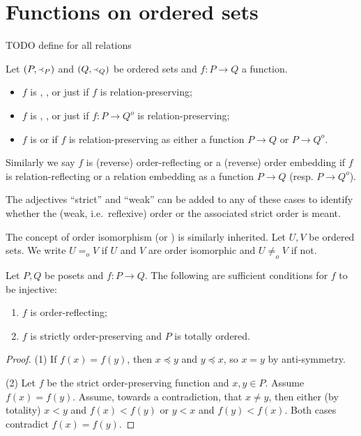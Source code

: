 \section{Functions on ordered sets}
TODO define for all relations
\begin{definition}
Let $(P, \Yleft_P)$ and $(Q, \Yleft_Q)$ be ordered sets and $f: P\to Q$ a function.
\begin{itemize}
\item $f$ is , ,  or just  if $f$ is relation-preserving;
\item $f$ is , ,  or just  if $f: P\to Q^o$ is relation-preserving;
\item $f$ is  or  if $f$ is relation-preserving as either a function $P\to Q$ or $P\to Q^o$.
\end{itemize}
Similarly we say $f$ is (reverse) order-reflecting or a (reverse) order embedding if $f$ is relation-reflecting or a relation embedding as a function $P\to Q$ (resp. $P\to Q^o$).

The adjectives ``strict'' and ``weak'' can be added to any of these cases to identify whether the (weak, i.e.\ reflexive) order or the associated strict order is meant.
\end{definition}
The concept of order isomorphism (or ) is similarly inherited. Let $U,V$ be ordered sets. We write $U =_o V$ if $U$ and $V$ are order isomorphic and $U \neq_o V$ if not.

\begin{lemma} \label{orderReflectionIsInjective} \label{strictOrderPreservationIsInjective}
Let $P,Q$ be posets and $f: P\to Q$. The following are sufficient conditions for $f$ to be injective:
\begin{enumerate}
\item $f$ is order-reflecting;
\item $f$ is strictly order-preserving and $P$ is totally ordered.
\end{enumerate}
\end{lemma}
\begin{proof}
(1) If $f(x) = f(y)$, then $x\preceq y$ and $y\preceq x$, so $x=y$ by anti-symmetry.

(2) Let $f$ be the strict order-preserving function and $x,y\in P$. Assume $f(x)=f(y)$. Assume, towards a contradiction, that $x\neq y$, then either (by totality) $x< y$ and $f(x) < f(y)$ or $y < x$ and $f(y)<f(x)$. Both cases contradict $f(x)=f(y)$.
\end{proof}

